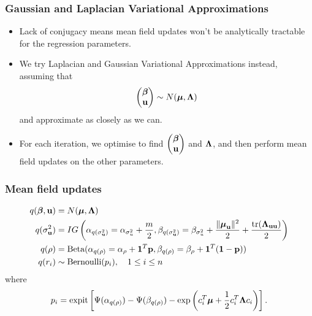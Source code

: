 \documentclass{beamer}
\begin{document}
\begin{frame}
\frametitle{Gaussian and Laplacian Variational Approximations}
\begin{itemize}
\item Lack of conjugacy means mean field updates won't be analytically tractable for the regression parameters.
\item We try Laplacian and Gaussian Variational Approximations instead, assuming that
$$
\begin{pmatrix}
{\boldsymbol\beta} \\
{\bf u}
\end{pmatrix}
\sim N({\boldsymbol \mu}, {\boldsymbol \Lambda})
$$
and approximate as closely as we can.
\item For each iteration, we optimise to find
$\begin{pmatrix}
{\boldsymbol\beta} \\
{\bf u}
\end{pmatrix}
$ and ${\boldsymbol \Lambda}$,
and then perform mean field updates on the other parameters.
\end{itemize}
\end{frame}

\begin{frame}
\frametitle{Mean field updates}
\begin{align*}
q({\boldsymbol \beta}, {\bf u}) &= N({\boldsymbol \mu}, {\boldsymbol \Lambda}) \\
q(\sigma_{{\bf u}}^2) &= IG\left(\alpha_{q(\sigma_{{\bf u}}^2)} = \alpha_{\sigma_u^2} + \frac{m}{2}, \beta_{q(\sigma_{{\bf u}}^2)} = \beta_{\sigma_u^2} + \frac{\|{\boldsymbol \mu}_{\bf u}\|^2}{2} + \frac{\text{tr}({\boldsymbol \Lambda}_{{\bf u}{\bf u}})}{2}\right) \\
q(\rho) &= \text{Beta}(\alpha_{q(\rho)} = \alpha_\rho + {\bf 1}^T{\bf p}, \beta_{q(\rho)} = \beta_\rho + {\bf 1}^T({\bf 1} - {\bf p})) \\
q(r_i) & \sim \text{Bernoulli}{(p_i)}, \ \ \ 1 \leq i \leq n
\end{align*}
where
$$
p_i = \text{expit} \left [\Psi{(\alpha_{q(\rho)})} - \Psi{(\beta_{q(\rho)})} - \exp{\left(c_i^T{\boldsymbol\mu}+ {\frac{1}{2}}c_i^T {\boldsymbol\Lambda}c_i\right)} \right ].
$$
\end{frame}

\end{document}
